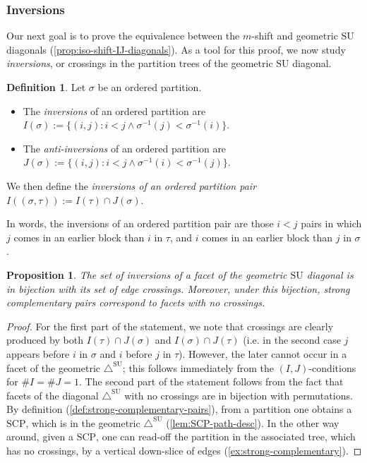 \documentclass{amsart}
\newcommand{\darkblue}{\color{darkblue}} %
\newtheorem{proposition}[theorem]{Proposition}
\theoremstyle{definition}
\newtheorem{definition}[theorem]{Definition}
\newcommand{\card}[1]{\##1} %
\newcommand{\defn}[1]{\textsl{\darkblue #1}} %
\newcommand{\SU}{\mathrm{SU}}
\newcommand{\SUD}{\triangle^{\mathrm{SU}}}
\newcommand{\SCP}{\mathrm{SCP}}
\begin{document}

\subsubsection{Inversions}
\label{subsec:inversions}

Our next goal is to prove the equivalence between the $m$-shift and geometric $\SU$ diagonals (\cref{prop:iso-shift-IJ-diagonals}).
As a tool for this proof, we now study \emph{inversions}, or crossings in the partition trees of the geometric $\SU$ diagonal.

\begin{definition}
Let $\sigma$ be an ordered partition.
\begin{itemize}
    \item The \defn{inversions} of an ordered partition are $I(\sigma):= \{(i,j): i<j \land \sigma^{-1}(j)<\sigma^{-1}(i) \}$.
    \item The \defn{anti-inversions} of an ordered partition are $J(\sigma):= \{(i,j): i<j \land \sigma^{-1}(i)< \sigma^{-1}(j) \}$.
\end{itemize}
We then define the \defn{inversions of an ordered partition pair} $I((\sigma,\tau)):=I(\tau)\cap J(\sigma)$. 
\end{definition}
In words, the inversions of an ordered partition pair are those $i<j$ pairs in which $j$ comes in an earlier block than $i$ in $\tau$, and $i$ comes in an earlier block than $j$ in $\sigma$. 

\begin{proposition}
\label{p:crossings}
The set of inversions of a facet of the geometric $\SU$ diagonal is in bijection with its set of edge crossings. 
Moreover, under this bijection, strong complementary pairs correspond to facets with no crossings.
\end{proposition}

\begin{proof}
For the first part of the statement,
we note that crossings are clearly produced by both $I(\tau)\cap J(\sigma)$ and $I(\sigma)\cap J(\tau)$ (i.e. in the second case $j$ appears before $i$ in $\sigma$ and $i$ before $j$ in $\tau$).
However, the later cannot occur in a facet of the geometric $\SUD$; this follows immediately from the $(I,J)$-conditions for $\card{I} = \card{J} = 1$. 
The second part of the statement follows from the fact that facets of the diagonal $\SUD$ with no crossings are in bijection with permutations.
By definition (\cref{def:strong-complementary-pairs}), from a partition one obtains a $\SCP$, which is in the geometric $\SUD$ (\cref{lem:SCP-path-desc}). 
In the other way around, given a $\SCP$, one can read-off the partition in the associated tree, which has no crossings, by a vertical down-slice of edges (\cref{ex:strong-complementary}).
\end{proof}
\end{document}
